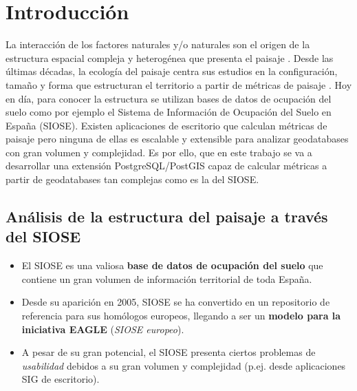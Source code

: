 
\chapter{Introducción}\label{chap:intro}

La interacción de los factores naturales y/o naturales son el origen de la estructura espacial compleja y heterogénea que presenta el paisaje \cite{Forman1986}  \cite{Turner2001}. Desde las últimas décadas, la ecología del paisaje centra sus estudios en la configuración, tamaño y forma que estructuran el territorio a partir de métricas de paisaje \cite{Aguilera2010}. Hoy en día, para conocer la estructura se utilizan bases de datos de ocupación del suelo como por ejemplo el Sistema de Información de Ocupación del Suelo en España (SIOSE). Existen aplicaciones de escritorio que calculan métricas de paisaje pero ninguna de ellas es escalable y extensible para analizar geodatabases con gran volumen y complejidad. Es por ello, que en este trabajo se va a desarrollar una extensión PostgreSQL/PostGIS capaz de calcular métricas a partir de geodatabases tan complejas como es la del SIOSE.

\section{Análisis de la estructura del paisaje a través del SIOSE}

\begin{graybox}
\begin{itemize}
\item El SIOSE es una valiosa \textbf{base de datos de ocupación del suelo} que contiene un gran volumen de información territorial de toda España.
\item Desde su aparición en 2005, SIOSE se ha convertido en un repositorio de referencia para sus homólogos europeos, llegando a ser un \textbf{modelo para la iniciativa EAGLE} (\textit{SIOSE europeo}). 
\item A pesar de su gran potencial, el SIOSE presenta ciertos problemas de \textit{usabilidad} debidos a su gran volumen y complejidad (p.ej. desde aplicaciones SIG de escritorio).
\end{itemize}
\end{graybox}


